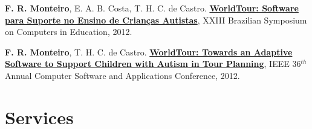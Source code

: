\documentclass[letterpaper]{article}
\renewenvironment{itemize}{
  \begin{list}{}{
    \setlength{\leftmargin}{1.5em}
  }
}{
  \end{list}
}
\begin{document}
\begin{itemize}
    \item {\bf F. R. Monteiro}, E. A. B. Costa, T. H. C. de Castro. \href{http://www.br-ie.org/pub/index.php/sbie/article/view/1806}{{\bf WorldTour: Software para Suporte no Ensino de Crian{\c c}as Autistas}},
  XXIII Brazilian Symposium on Computers in Education, 2012.
    
    \item {\bf F. R. Monteiro}, T. H. C. de Castro. \href{http://ieeexplore.ieee.org/abstract/document/6340181/}{{\bf WorldTour: Towards an Adaptive Software to Support Children with Autism in Tour Planning}},
  IEEE 36$^{th}$ Annual Computer Software and Applications Conference, 2012.

\end{itemize}


\section*{Services}
\end{document}
